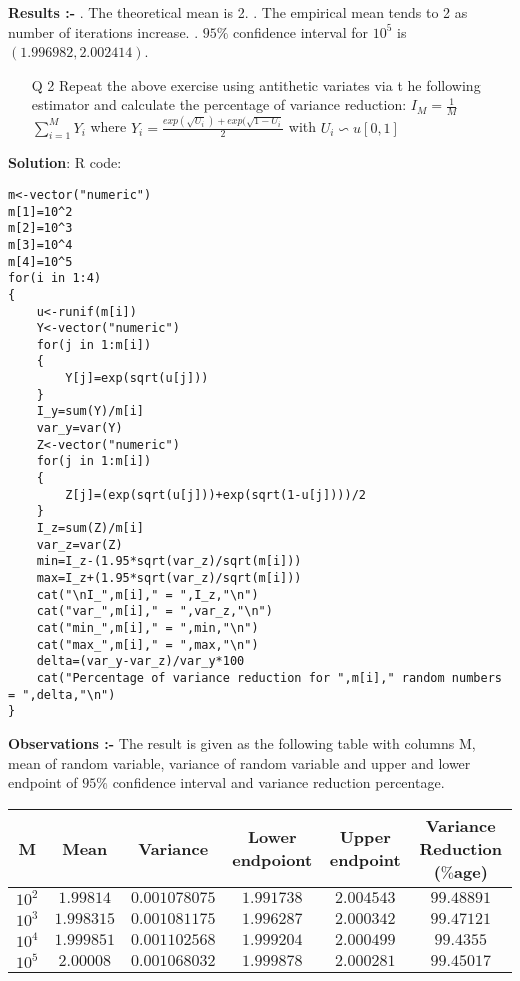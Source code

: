 \documentclass[12pt]{book}
\begin{document}
\textbf{\large Results :-} . The theoretical mean is 2. . The empirical mean tends to 2 as number of iterations increase. . $95\%$ confidence interval for $10^5$ is $( 1.996982,2.002414 )$.

\newpage
\begin{enumerate}
\item[Q 2] Repeat the above exercise using antithetic variates via t
he following estimator and calculate the percentage of variance reduction:
\newline $I_M=\frac{1}{M}$ $\sum_{i=1}^M Y_i$ \newline where $Y_i=\frac{exp(\sqrt{U_i}) + exp (\sqrt{1- {U_i}}}{2} $ \newline with $ U_i \backsim u[0,1] $\\
\end{enumerate}

\textbf{Solution}: R code:
\begin{lstlisting}
m<-vector("numeric")
m[1]=10^2
m[2]=10^3
m[3]=10^4
m[4]=10^5
for(i in 1:4)
{
	u<-runif(m[i])
	Y<-vector("numeric")
	for(j in 1:m[i])
	{
		Y[j]=exp(sqrt(u[j]))
	}
	I_y=sum(Y)/m[i]
	var_y=var(Y)
	Z<-vector("numeric")
	for(j in 1:m[i])
	{
		Z[j]=(exp(sqrt(u[j]))+exp(sqrt(1-u[j])))/2
	}
	I_z=sum(Z)/m[i]
	var_z=var(Z)
	min=I_z-(1.95*sqrt(var_z)/sqrt(m[i]))
	max=I_z+(1.95*sqrt(var_z)/sqrt(m[i]))
	cat("\nI_",m[i]," = ",I_z,"\n")
	cat("var_",m[i]," = ",var_z,"\n")
	cat("min_",m[i]," = ",min,"\n")
	cat("max_",m[i]," = ",max,"\n")
	delta=(var_y-var_z)/var_y*100
	cat("Percentage of variance reduction for ",m[i]," random numbers = ",delta,"\n")
}
\end{lstlisting}

\newpage
\textbf{\large Observations :-} \newline
The result is given as the following table with columns M, mean of random variable, variance of random variable and upper and lower endpoint of $95\%$ confidence interval and variance reduction percentage.

\begin{center}
 \begin{tabular}{||c c c c c c||} 
 \hline
 M & Mean & Variance & Lower endpoiont & Upper endpoint & Variance Reduction ($\%$age)\\ [0.5ex] 
 \hline\hline
 $10^2$ & $1.99814$ & $0.001078075$ & $1.991738$ & $2.004543$ & $99.48891$\\ 
 \hline
 $10^3$ & $1.998315$ & $0.001081175$ & $1.996287$ & $2.000342$ & $99.47121$\\
 \hline
 $10^4$ & $1.999851$ & $0.001102568$ & $1.999204$ & $2.000499$ & $99.4355$\\
 \hline
 $10^5$ & $2.00008$ & $0.001068032$ & $1.999878$ & $2.000281$ & $99.45017$\\  [1ex] 
 \hline
\end{tabular}
\end{center}
\end{document}
